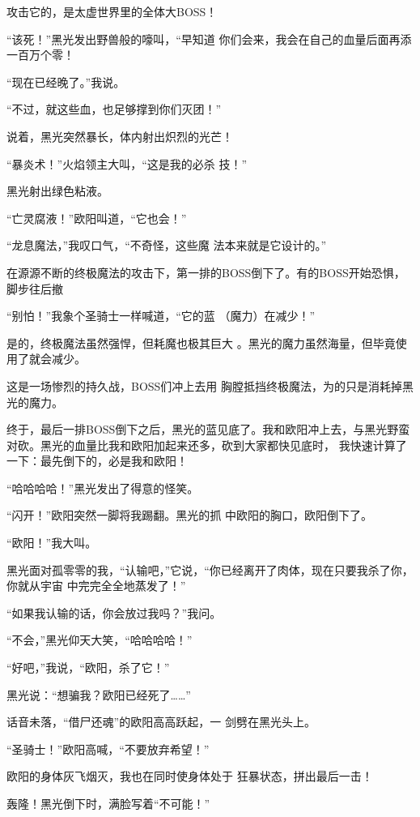 \documentclass{article}
\begin{document}
攻击它的，是太虚世界里的全体大BOSS！

“该死！”黑光发出野兽般的嚎叫，“早知道
\newpage
你们会来，我会在自己的血量后面再添一百万个零！


“现在已经晚了。”我说。 

“不过，就这些血，也足够撑到你们灭团！”

说着，黑光突然暴长，体内射出炽烈的光芒！

“暴炎术！”火焰领主大叫，“这是我的必杀
技！” 


黑光射出绿色粘液。 


“亡灵腐液！”欧阳叫道，“它也会！” 

“龙息魔法，”我叹口气，“不奇怪，这些魔
法本来就是它设计的。” 

在源源不断的终极魔法的攻击下，第一排的BOSS倒下了。有的BOSS开始恐惧，脚步往后撤

\newpage

“别怕！”我象个圣骑士一样喊道，“它的蓝
（魔力）在减少！” 

是的，终极魔法虽然强悍，但耗魔也极其巨大
。黑光的魔力虽然海量，但毕竟使用了就会减少。 

这是一场惨烈的持久战，BOSS们冲上去用
胸膛抵挡终极魔法，为的只是消耗掉黑光的魔力。 

终于，最后一排BOSS倒下之后，黑光的蓝见底了。我和欧阳冲上去，与黑光野蛮对砍。黑光的血量比我和欧阳加起来还多，砍到大家都快见底时，
我快速计算了一下：最先倒下的，必是我和欧阳！ 


“哈哈哈哈！”黑光发出了得意的怪笑。 

“闪开！”欧阳突然一脚将我踢翻。黑光的抓
中欧阳的胸口，欧阳倒下了。 


“欧阳！”我大叫。 

\newpage

黑光面对孤零零的我，“认输吧，”它说，“你已经离开了肉体，现在只要我杀了你，你就从宇宙
中完完全全地蒸发了！” 

“如果我认输的话，你会放过我吗？”我问。


“不会，”黑光仰天大笑，“哈哈哈哈！” 


“好吧，”我说，“欧阳，杀了它！” 


黑光说：“想骗我？欧阳已经死了……” 

话音未落，“借尸还魂”的欧阳高高跃起，一
剑劈在黑光头上。 

“圣骑士！”欧阳高喊，“不要放弃希望！”

欧阳的身体灰飞烟灭，我也在同时使身体处于
狂暴状态，拼出最后一击！ 


\newpage

轰隆！黑光倒下时，满脸写着“不可能！” 
\end{document}
